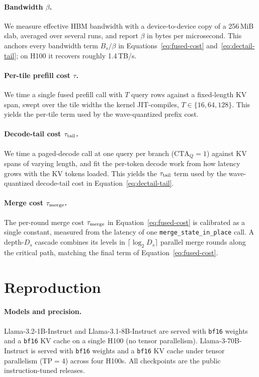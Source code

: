 \documentclass[11pt]{article}
\begin{document}
  \paragraph{Bandwidth $\beta$.}
  We measure effective HBM bandwidth with a device-to-device copy of a
  256\,MiB slab, averaged over several runs, and report $\beta$ in bytes
  per microsecond. This anchors every bandwidth term $B_s/\beta$ in
  Equations~\ref{eq:fused-cost} and~\ref{eq:dectail-tail}; on H100 it
  recovers roughly 1.4\,TB/s.

  \paragraph{Per-tile prefill cost $\tau$.}
  We time a single fused prefill call with $T$ query rows against a
  fixed-length KV span, swept over the tile widths the kernel
  JIT-compiles, $T \in \{16, 64, 128\}$. This yields the per-tile term
  used by the wave-quantized prefix cost.
  
\paragraph{Decode-tail cost $\tau_{\rm tail}$.}
  We time a paged-decode call at one query per branch
  ($\mathrm{CTA}_Q = 1$) against KV spans of varying length, and fit the
  per-token decode work from how latency grows with the KV tokens loaded.
  This yields the $\tau_{\rm tail}$ term used by the wave-quantized
  decode-tail cost in Equation~\ref{eq:dectail-tail}.
  
\paragraph{Merge cost $\tau_{\rm merge}$.}
  The per-round merge cost $\tau_{\rm merge}$ in Equation~\ref{eq:fused-cost}
  is calibrated as a single constant, measured from the latency of one
  \texttt{merge\_state\_in\_place} call. A depth-$D_s$ cascade combines its
  levels in $\lceil \log_2 D_s \rceil$ parallel merge rounds along the
  critical path, matching the final term of
  Equation~\ref{eq:fused-cost}.

  \section{Reproduction}
  \label{appendix:reproduction}

  \paragraph{Models and precision.}
  Llama-3.2-1B-Instruct and Llama-3.1-8B-Instruct are served with
  \texttt{bf16} weights and a \texttt{bf16} KV cache on a single H100
  (no tensor parallelism). Llama-3-70B-Instruct is served with
  \texttt{bf16} weights and a \texttt{bf16} KV cache under tensor
  parallelism (TP$=4$) across four H100s. All checkpoints are the public
  instruction-tuned releases.
\end{document}
